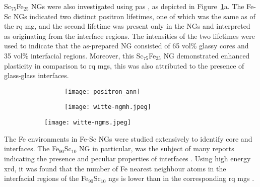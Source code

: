 Sc$_{75}$Fe$_{25}$ NGs were also investigated using \gls{pas} \cite{Fang2012}, as depicted in Figure~\ref{f:ng-evidence}a. The Fe-Sc NGs indicated two distinct positron lifetimes, one of which was the same as of the \gls{rq} \gls{mg}, and the second lifetime was present only in the NGs and interpreted as originating from the interface regions. The intensities of the two lifetimes were used to indicate that the as-prepared NG consisted of 65 vol\% glassy cores and 35 vol\% interfacial regions. Moreover, this Sc$_{75}$Fe$_{25}$  NG demonstrated enhanced plasticity in comparison to \gls{rq} \gls{mg}s, this was also attributed to the presence of glass-glass interfaces. \par

\begin{figure}[!h] \centering
	\begin{subfigure}{0.4\linewidth}
		\begin{subfigure}{\linewidth}
		\texttt{[image: positron\_ann]} \subcaption{}
		\end{subfigure}%
		\vfill	
		\begin{subfigure}{\linewidth}
		\texttt{[image: witte-ngmh.jpeg]} \subcaption{}
		\end{subfigure}%
	\end{subfigure}%
	\hfill
	\begin{subfigure}{0.6\linewidth} \centering
		\texttt{[image: witte-ngms.jpeg]} \subcaption{}
	\end{subfigure}%

	\label{f:ng-evidence}
\end{figure}

The Fe environments in Fe-Sc NGs were studied extensively to identify core and interfaces. The Fe$_{90}$Sc$_{10}$ NG in particular, was the subject of many reports indicating the presence and peculiar properties of interfaces \cite{Ghafari2012,Ghafari2012c,Witte2013,Wang2016,Wang2017}. Using high energy \gls{xrd}, it was found that the number of Fe nearest neighbour atoms in the interfacial regions of the Fe$_{90}$Sc$_{10}$ \gls{ng}s is lower than in the corresponding \gls{rq} \gls{mg}s \cite{Ghafari2012c}. \par

